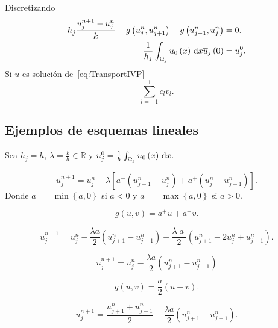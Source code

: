 Discretizando
\begin{align*}
	h_{j}
	\frac{u^{n+1}_{j}-u^{n}_{j}}{k}+
	g\left(u^{n}_{j},u^{n}_{j+1}\right)-
	g\left(u^{n}_{j-1},u^{n}_{j}\right) & =
	0.                                      \\
	\frac{1}{h_{j}}
	\int_{\Omega_{j}}
	u_{0}\left(x\right)\dl x
	\overline{u}_{j}\left(0\right)      & =
	u^{0}_{j}.
\end{align*}
Si $u$ es solución de~\eqref{eq:TransportIVP}
\begin{equation*}
	\sum_{l=-1}^{1}
	c_{l}v_{l}.
\end{equation*}

\subsection{Ejemplos de esquemas lineales}

Sea $h_{j}=h$, $\lambda=\frac{k}{h}\in\mathbb{R}$ y
\begin{math}
	u^{0}_{j}=
	\frac{1}{h}
	\int_{\Omega_{j}}
	u_{0}\left(x\right)\dl x
\end{math}.

\begin{equation*}
	u^{n+1}_{j}=
	u^{n}_{j}-
	\lambda
	\left[
		a^{-}\left(u^{n}_{j+1}-u^{n}_{j}\right)+
		a^{+}\left(u^{n}_{j}-u^{n}_{j-1}\right)
		\right].
\end{equation*}
Donde $a^{-}=\min\left\{a,0\right\}$ si $a<0$ y $a^{+}=\max\left\{a,0\right\}$ si $a>0$.

\begin{equation*}
	g\left(u,v\right)=
	a^{+}u+a^{-}v.
\end{equation*}

\begin{equation*}
	u^{n+1}_{j}=
	u^{n}_{j}-
	\frac{\lambda a}{2}
	\left(u^{n}_{j+1}-u^{n}_{j-1}\right)+
	\frac{\lambda\left|a\right|}{2}
	\left(u^{n}_{j+1}-2u^{n}_{j}+u^{n}_{j-1}\right).
\end{equation*}

\begin{equation*}
	u^{n+1}_{j}=
	u^{n}_{j}-
	\frac{\lambda a}{2}
	\left(u^{n}_{j+1}-u^{n}_{j-1}\right)
\end{equation*}

\begin{equation*}
	g\left(u,v\right)=
	\frac{a}{2}\left(u+v\right).
\end{equation*}

\begin{equation*}
	u^{n+1}_{j}=
	\frac{u^{n}_{j+1}+u^{n}_{j-1}}{2}-
	\frac{\lambda a}{2}
	\left(u^{n}_{j+1}-u^{n}_{j-1}\right).
\end{equation*}

